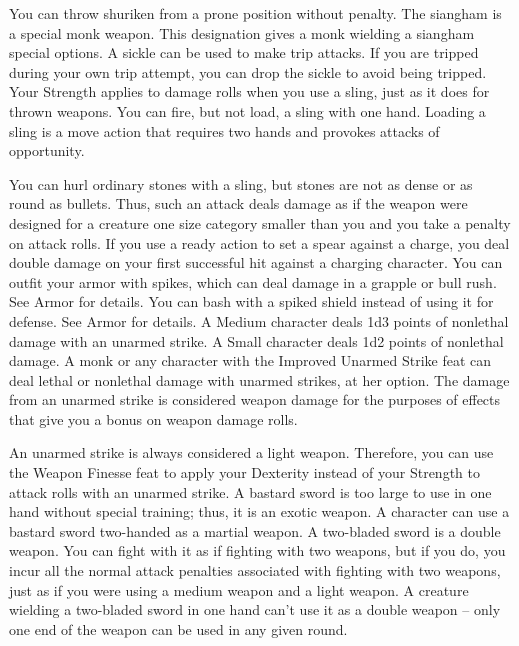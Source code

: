 \par You can throw shuriken from a prone position without penalty.
 The siangham is a special monk weapon. This designation gives a monk wielding a siangham special options.
 A sickle can be used to make trip attacks. If you are tripped during your own trip attempt, you can drop the sickle to avoid being tripped.
 Your Strength applies to damage rolls when you use a sling, just as it does for thrown weapons. You can fire, but not load, a sling with one hand. Loading a sling is a move action that requires two hands and provokes attacks of opportunity.
\par You can hurl ordinary stones with a sling, but stones are not as dense or as round as bullets. Thus, such an attack deals damage as if the weapon were designed for a creature one size category smaller than you and you take a  penalty on attack rolls.
 If you use a ready action to set a spear against a charge, you deal double damage on your first successful hit against a charging character.
 You can outfit your armor with spikes, which can deal damage in a grapple or bull rush. See Armor for details.
 You can bash with a spiked shield instead of using it for defense. See Armor for details.
 A Medium character deals 1d3 points of nonlethal damage with an unarmed strike. A Small character deals 1d2 points of nonlethal damage. A monk or any character with the Improved Unarmed Strike feat can deal lethal or nonlethal damage with unarmed strikes, at her option. The damage from an unarmed strike is considered weapon damage for the purposes of effects that give you a bonus on weapon damage rolls.
\par An unarmed strike is always considered a light weapon. Therefore, you can use the Weapon Finesse feat to apply your Dexterity instead of your Strength to attack rolls with an unarmed strike.
 A bastard sword is too large to use in one hand without special training; thus, it is an exotic weapon. A character can use a bastard sword two-handed as a martial weapon.
 A two-bladed sword is a double weapon. You can fight with it as if fighting with two weapons, but if you do, you incur all the normal attack penalties associated with fighting with two weapons, just as if you were using a medium weapon and a light weapon. A creature wielding a two-bladed sword in one hand can't use it as a double weapon -- only one end of the weapon can be used in any given round.
